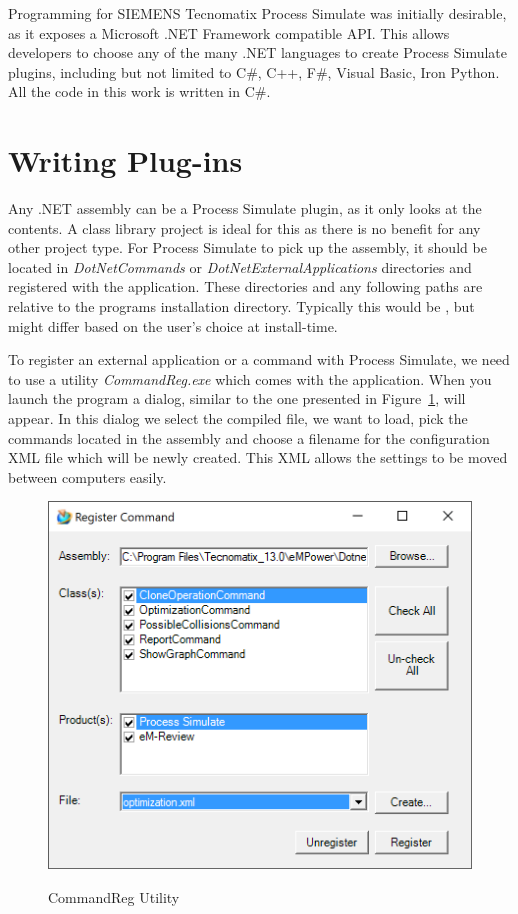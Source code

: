 Programming for SIEMENS Tecnomatix Process Simulate was initially desirable, as it exposes a Microsoft .NET Framework compatible API. 
This allows developers to choose any of the many .NET languages to create Process Simulate plugins, including but not limited to C\#, C++, F\#, Visual Basic, Iron Python. 
All the code in this work is written in C\#.

\section{Writing Plug-ins}
Any .NET assembly can be a Process Simulate plugin, as it only looks at the contents. 
A class library project is ideal for this as there is no benefit for any other project type. 
For Process Simulate to pick up the assembly, it should be located in \emph{DotNetCommands} or \emph{DotNetExternalApplications} directories and registered with the application. 
These directories and any following paths are relative to the programs installation directory. 
Typically this would be , but might differ based on the user's choice at install-time.

To register an external application or a command with Process Simulate, we need to use a utility \emph{CommandReg.exe} which comes with the application. 
When you launch the program a dialog, similar to the one presented in Figure~\ref{fig:CommandReg}, will appear. 
In this dialog we select the compiled file, we want to load, pick the commands located in the assembly and choose a filename for the configuration XML file which will be newly created. 
This XML allows the settings to be moved between computers easily. \\

\begin{figure}[H]
    \caption{CommandReg Utility}
    \centering
    \includegraphics{commandreg}
    \label{fig:CommandReg}
\end{figure}

